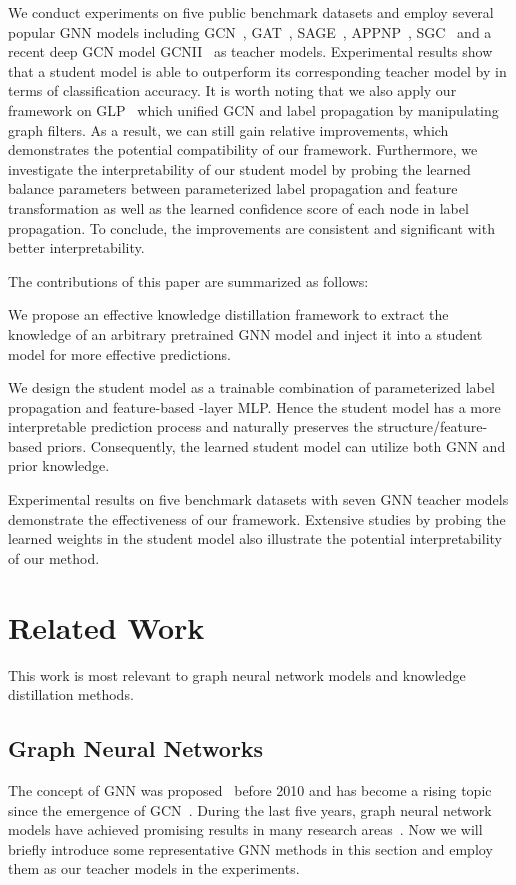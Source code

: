 \documentclass[sigconf]{acmart}
\begin{document}
We conduct experiments on five public benchmark datasets and employ several popular GNN models including GCN~\cite{kipf2016semi}, GAT~\cite{velivckovic2018graph}, SAGE~\cite{hamilton2017inductive}, APPNP~\cite{klicpera2018predict}, SGC~\cite{wu2019simplifying} and a recent deep GCN model GCNII~\cite{chen2020simple} as teacher models. Experimental results show that a student model is able to outperform its corresponding teacher model by  in terms of classification accuracy. It is worth noting that we also apply our framework on GLP~\cite{li2019label} which unified GCN and label propagation by manipulating graph filters. As a result, we can still gain  relative improvements, which demonstrates the potential compatibility of our framework. Furthermore, we investigate the interpretability of our student model by probing the learned balance parameters between parameterized label propagation and feature transformation as well as the learned confidence score of each node in label propagation. To conclude, the improvements are consistent and significant with better interpretability.

The contributions of this paper are summarized as follows:

 We propose an effective knowledge distillation framework to extract the knowledge of an arbitrary pretrained GNN model and inject it into a student model for more effective predictions.

  We design the student model as a trainable combination of parameterized label propagation and feature-based -layer MLP. Hence the student model has a more interpretable prediction process and naturally preserves the structure/feature-based priors. Consequently, the learned student model can utilize both GNN and prior knowledge.

 Experimental results on five benchmark datasets with seven GNN teacher models demonstrate the effectiveness of our framework. Extensive studies by probing the learned weights in the student model also illustrate the potential interpretability of our method.
\section{Related Work}
This work is most relevant to graph neural network models and knowledge distillation methods.
\subsection{Graph Neural Networks}
The concept of GNN was proposed~\cite{scarselli2008graph} before 2010 and has become a rising topic since the emergence of GCN~\cite{kipf2016semi}. During the last five years, graph neural network models have achieved promising results in many research areas~\cite{wu2020comprehensive,zhou2018graph}. Now we will briefly introduce some representative GNN methods in this section and employ them as our teacher models in the experiments.
\end{document}
